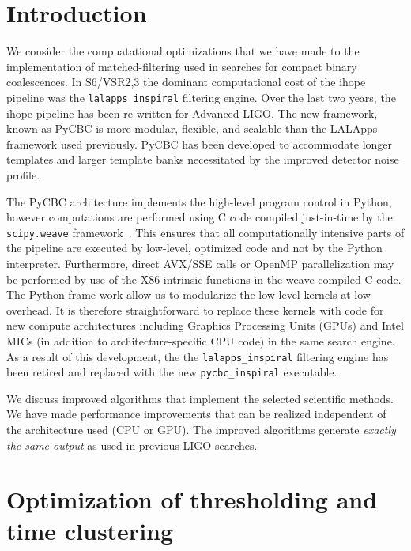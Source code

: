 \section{Introduction}

We consider the compuatational optimizations that we have made to the implementation
of matched-filtering used in searches for compact binary coalescences.
In S6/VSR2,3 the dominant computational cost of the ihope pipeline was the \texttt{lalapps\_inspiral}
filtering engine. Over the last two years, the ihope pipeline has been
re-written for Advanced LIGO. The new framework, known as PyCBC is more modular,
flexible, and scalable than the LALApps framework used previously. PyCBC has
been developed to accommodate longer templates and larger template banks
necessitated by the improved detector noise profile.

The PyCBC architecture implements the high-level program control in Python,
however computations are performed using C code compiled just-in-time by the
\texttt{scipy.weave} framework~\cite{scipy}.  This ensures that all computationally intensive parts
of the pipeline are executed by low-level, optimized code and not by the
Python interpreter. Furthermore, direct AVX/SSE calls or OpenMP parallelization
may be performed by use of the X86 intrinsic functions in the weave-compiled
C-code.  The Python frame work allow us to modularize the low-level kernels at
low overhead. It is therefore straightforward to replace these kernels with
code for new compute architectures including Graphics Processing Units (GPUs)
and Intel\textsuperscript{\textregistered} MICs (in addition to architecture-specific CPU code) in the same
search engine. As a result of this development, the the \texttt{lalapps\_inspiral} filtering
engine has been retired and replaced with the new \texttt{pycbc\_inspiral}
executable. 

We discuss improved algorithms that implement the selected
scientific methods. We have made performance improvements that can be realized
independent of the architecture used (CPU or GPU). The improved algorithms
generate \emph{exactly the same output} as used in previous LIGO searches. 

\vspace*{-10pt}
\section{Optimization of thresholding and time clustering}
\vspace*{-05pt}
\label{sec:opt-thresh}

